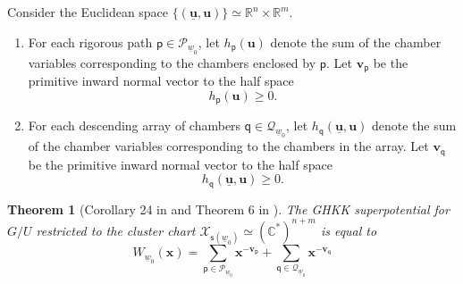 \documentclass[11pt]{amsart}
\theoremstyle{plain}
\newtheorem{theorem}{Theorem}[section]
\theoremstyle{definition}
\theoremstyle{remark}
\newcommand{\C}{\mathbb{C}}
\newcommand{\R}{\mathbb{R}}
\numberwithin{equation}{section} \numberwithin{table}{section}
\numberwithin{equation}{section}
\begin{document}
Consider the Euclidean space $\{(\underline{\mathbf{u}}, {\mathbf{u}})\} \simeq \R^n \times \R^m$.
\begin{enumerate}
\item For each rigorous path $\mathsf{p} \in \mathcal{P}_{\underline{w}_0}$, let $h_{\mathsf{p}}(\mathbf{u})$ denote the sum of the chamber variables corresponding to the chambers enclosed by $\mathsf{p}$. Let $\mathbf{v}_\mathsf{p}$ be the primitive inward  normal vector to the half space
\begin{equation}\label{equ_stringincone}
h_{\mathsf{p}}(\mathbf{u}) \geq 0.
\end{equation}
\item For each descending array of chambers $\mathsf{q}\in\mathcal{Q}_{\underline{w}_0}$, let $h_{\mathsf{q}}(\underline{\mathbf{u}}, {\mathbf{u}})$ denote the sum of the chamber variables corresponding to the chambers in the array. Let $\mathbf{v}_\mathsf{q}$ be the primitive inward normal vector to the half space
$$
h_{\mathsf{q}}(\underline{\mathbf{u}}, {\mathbf{u}}) \geq 0.
$$
\end{enumerate}

\begin{theorem}[Corollary 24 in \cite{Mag15} and Theorem 6 in \cite{BF19}]
The GHKK superpotential for $G/U$ restricted to the cluster chart $\mathcal{X}_{\mathsf{s}(\underline{w}_0)} \simeq (\C^*)^{n+m}$ is equal to
\begin{equation}\label{equ_GHKKssupter}
W_{\underline{w}_0}(\mathbf{x}) = \sum_{\mathsf{p} \in \mathcal{P}_{\underline{w}_0}} \mathbf{x}^{-\mathbf{v}_\mathsf{p}} +  \sum_{\mathsf{q} \in \mathcal{Q}_{\underline{w}_0}} \mathbf{x}^{-\mathbf{v}_\mathsf{q}} 
\end{equation}
\end{theorem}
\end{document}
